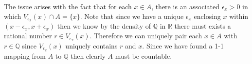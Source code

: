 \documentclass[12pt, letterpaper]{article}
\newcommand{\N}{\mathbb{N}}
\newcommand{\R}{\mathbb{R}}
\newcommand{\Q}{\mathbb{Q}}
\begin{document}
\begin{enumerate}
				The issue arises with the fact that for each $x \in A$, there is an associated $\epsilon_x > 0$ in which $V_{\epsilon_x} (x) \cap A = \{x\}$.  Note that since we have a unique $\epsilon_x$ enclosing $x$ within $(x-\epsilon_x,x+\epsilon_x)$ then we know by the density of $\Q$ in $\R$ there
				must exists a rational number $r \in V_{\epsilon_x}(x)$. 
				Therefore we can uniquely pair each $x\in A$ with $r\in \Q$ 
				since $V_{\epsilon_x}(x)$ uniquely contains $r$ and $x$.  
				Since we have found a 1-1 mapping from $A$ to $\Q$ then clearly $A$ must be countable.  
				
				
				
				
				
				
				
				
				
				\iffalse A set with an uncountable number of isolated points.\\
				 This can't occur, as for every isolated point $x$ in our supposed set $A$, we have an associated $\epsilon_x$ for which $V_{\epsilon_x}(x)$ contains only $x$ and no other points in $A$.  Therefore thinking geometrically, there is a 
				 "minimum spacing" between the points.  This has only been seen so 
				 far with countable sets.  
				 \fi 
				 \fi
	\end{enumerate}
\end{document}
